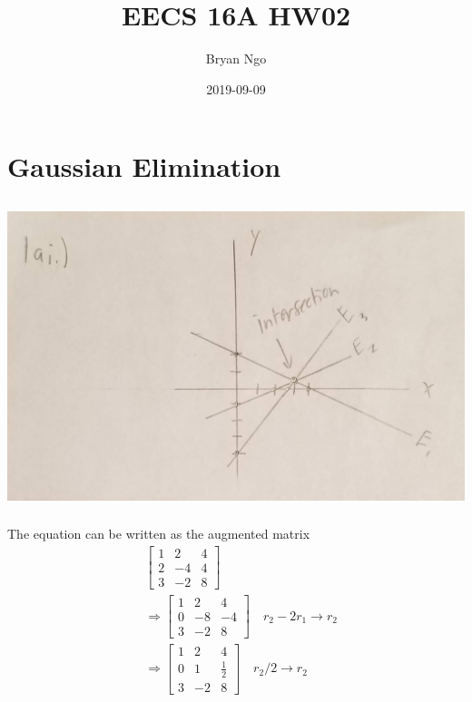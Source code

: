 \documentclass[]{article}
\title{EECS 16A HW02}
\author{Bryan Ngo}
\date{2019-09-09}
\begin{document}
\maketitle

\section{Gaussian Elimination}

\subsection{}

\subsubsection{}

\begin{center}
	\includegraphics[width=0.7\linewidth]{20190912_160635}
\end{center}

\subsubsection{}

The equation can be written as the augmented matrix
\begin{align}
	&\left[
	\begin{array}{cc|c}
	1 & 2 & 4 \\
	2 & -4 & 4 \\
	3 & -2 & 8
	\end{array}
	\right] \\
	&\Rightarrow \left[
	\begin{array}{cc|c}
	1 & 2 & 4 \\
	0 & -8 & -4 \\
	3 & -2 & 8
	\end{array}
	\right] \quad r_2 - 2r_1 \to r_2 \\
	&\Rightarrow \left[
	\begin{array}{cc|c}
	1 & 2 & 4 \\
	0 & 1 & \frac{1}{2} \\
	3 & -2 & 8
	\end{array}
	\right] \quad r_2 / 2 \to r_2
\end{align}
\end{document}
